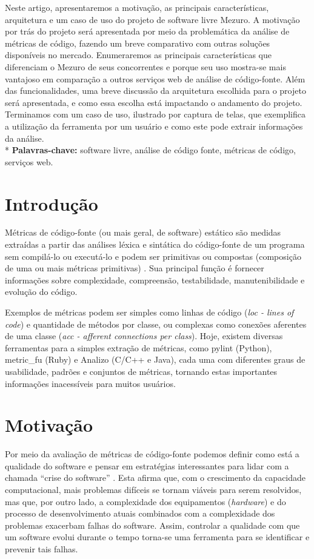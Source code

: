 \documentclass[10pt]{article}
\begin{document}
\begin{resumo}
  Neste artigo, apresentaremos a motivação, as principais características, arquitetura e um caso de uso do projeto de software livre Mezuro.
  A motivação por trás do projeto será apresentada por meio da problemática da análise de métricas de código, fazendo um breve
  comparativo com outras soluções disponíveis no mercado. Enumeraremos as principais características que diferenciam
  o Mezuro de seus concorrentes e porque seu uso mostra-se mais vantajoso em comparação a outros serviços web de análise de código-fonte.
  Além das funcionalidades, uma breve discussão da arquitetura escolhida para o projeto
  será apresentada, e como essa escolha está impactando o andamento do projeto. Terminamos com um caso de uso, ilustrado por captura de telas, que exemplifica
  a utilização da ferramenta por um usuário e como este pode extrair informações da análise.
  \\*
  \textbf{Palavras-chave:} software livre, análise de código fonte, métricas de código, serviços web.
\end{resumo}

\newpage

\section{Introdução} \label{sec:intro}
Métricas de código-fonte (ou mais geral, de software) estático são medidas extraídas a partir das análises léxica e sintática do código-fonte de um programa sem compilá-lo ou executá-lo e podem ser primitivas ou compostas (composição de uma ou mais métricas primitivas) \cite{m13}. Sua principal função é fornecer informações sobre complexidade, compreensão, testabilidade, manutenibilidade e evolução do código\cite{m13}.

Exemplos de métricas podem ser simples como linhas de código (\textit{loc - lines of code}) e quantidade de métodos por classe, ou complexas como conexões aferentes de uma classe (\textit{acc - afferent connections per class}).
Hoje, existem diversas ferramentas para a simples extração de métricas, como pylint (Python), metric\_fu (Ruby) e Analizo (C/C++ e Java), cada uma com diferentes graus de usabilidade, padrões e conjuntos de métricas, tornando estas importantes informações inacessíveis para muitos usuários.

\section{Motivação}
Por meio da avaliação de métricas de código-fonte podemos definir como está a qualidade do software e pensar em estratégias interessantes para lidar com a chamada ``crise do software'' \cite{nr68}. Esta afirma que, com o crescimento da capacidade computacional, mais problemas difíceis se tornam viáveis para serem resolvidos, mas que, por outro lado, a complexidade dos equipamentos (\textit{hardware}) e do processo de desenvolvimento atuais combinados com a complexidade dos problemas exacerbam falhas do software. Assim, controlar a qualidade com que um software evolui durante o tempo torna-se uma ferramenta para se identificar e prevenir tais falhas.
\end{document}
